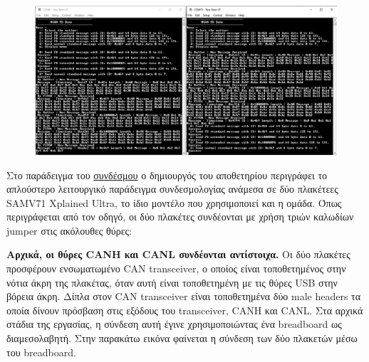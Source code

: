 \documentclass[a4paper,nobib,justified]{tufte-book}
\begin{document}
\begin{figure}[ht]
	\includegraphics{media/images/microchip-example-menu.png}
\end{figure}

\par Στο παράδειγμα του \href{https://github.com/Microchip-MPLAB-Harmony/csp_apps_sam_e70_s70_v70_v71/tree/master/apps/mcan/mcan_fd_operation_interrupt_timestamp}{συνδέσμου} ο δημιουργός του αποθετηρίου περιγράφει το απλούστερο λειτουργικό παράδειγμα συνδεσμολογίας ανάμεσα σε δύο πλακέτεες SAMV71 Xplained Ultra, το ίδιο μοντέλο που χρησιμοποιεί και η ομάδα. Όπως περιγράφεται από τον οδηγό, οι δύο πλακέτες συνδέονται με χρήση τριών καλωδίων jumper στις ακόλουθες θύρες:

\par \textbf{Αρχικά, οι θύρες CANH και CANL συνδέονται αντίστοιχα.} Οι δύο πλακέτες προσφέρουν ενσωματωμένο CAN transceiver, ο οποίος είναι τοποθετημένος στην νότια άκρη της πλακέτας, όταν αυτή είναι τοποθετημένη με τις θύρες USB στην βόρεια άκρη. Δίπλα στον CAN transceiver είναι τοποθετημένα δύο male headers τα οποία δίνουν πρόσβαση στις εξόδους του transceiver, CANH και CANL. Στα αρχικά στάδια της εργασίας, η σύνδεση αυτή έγινε χρησιμοποιώντας ένα breadboard ως διαμεσολαβητή. Στην παρακάτω εικόνα φαίνεται η σύνδεση των δύο πλακετών μέσω του breadboard.
\end{document}
